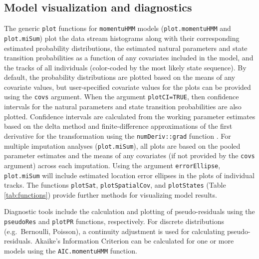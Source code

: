 \documentclass[12pt]{article}\usepackage[]{graphicx}\usepackage[]{xcolor}
\begin{document}
\subsection{Model visualization and diagnostics}
The generic \verb|plot| functions for \verb|momentuHMM| models (\verb|plot.momentuHMM| and \verb|plot.miSum|) plot the data stream histograms along with their corresponding estimated probability distributions, the estimated natural parameters and state transition probabilities as a function of any covariates included in the model, and the tracks of all individuals (color-coded by the most likely state sequence). By default, the probability distributions are plotted based on the means of any covariate values, but user-specified covariate values for the plots can be provided using the \verb|covs| argument.  When the argument \verb|plotCI=TRUE|, then confidence intervals for the natural parameters and state transition probabilities are also plotted. Confidence intervals are calculated from the working parameter estimates based on the delta method and finite-difference approximations of the first derivative for the transformation using the \verb|numDeriv::grad| function \citep{GilbertVaradhan2016}.  For multiple imputation analyses (\verb|plot.miSum|), all plots are based on the pooled parameter estimates and the means of any covariates (if not provided by the \verb|covs| argument) across each imputation. Using the argument \verb|errorEllipse|, \verb|plot.miSum| will include estimated location error ellipses in the plots of individual tracks. The functions \verb|plotSat|, \verb|plotSpatialCov|, and \verb|plotStates| (Table \ref{tab:functions}) provide further methods for visualizing model results.

Diagnostic tools include the calculation and plotting of pseudo-residuals \citep{ZucchiniEtAl2016} using the \verb|pseudoRes| and \verb|plotPR| functions, respectively. For discrete distributions (e.g.\ Bernoulli, Poisson), a continuity adjustment is used for calculating pseudo-residuals. Akaike's Information Criterion can be calculated for one or more models using the \verb|AIC.momentuHMM| function.
\end{document}
